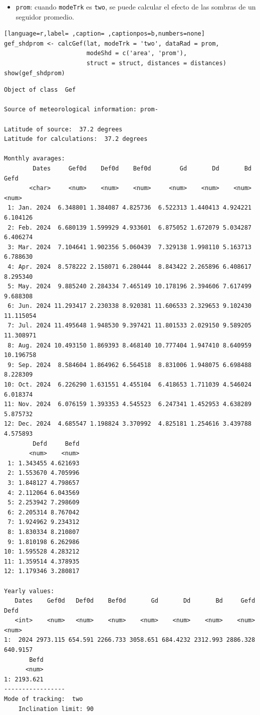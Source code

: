 \begin{itemize}
\item \texttt{prom}: cuando \texttt{modeTrk} es \texttt{two}, se puede calcular el efecto de las sombras de un seguidor promedio.
\end{itemize}
\begin{lstlisting}[language=r,label= ,caption= ,captionpos=b,numbers=none]
gef_shdprom <- calcGef(lat, modeTrk = 'two', dataRad = prom,
                       modeShd = c('area', 'prom'),
                       struct = struct, distances = distances)
show(gef_shdprom)
\end{lstlisting}

\begin{verbatim}
Object of class  Gef 

Source of meteorological information: prom- 

Latitude of source:  37.2 degrees
Latitude for calculations:  37.2 degrees

Monthly avarages:
        Dates     Gef0d    Def0d    Bef0d        Gd       Dd       Bd      Gefd
       <char>     <num>    <num>    <num>     <num>    <num>    <num>     <num>
 1: Jan. 2024  6.348801 1.384087 4.825736  6.522313 1.440413 4.924221  6.104126
 2: Feb. 2024  6.680139 1.599929 4.933601  6.875052 1.672079 5.034287  6.406274
 3: Mar. 2024  7.104641 1.902356 5.060439  7.329138 1.998110 5.163713  6.788630
 4: Apr. 2024  8.578222 2.158071 6.280444  8.843422 2.265896 6.408617  8.295340
 5: May. 2024  9.885240 2.284334 7.465149 10.178196 2.394606 7.617499  9.688308
 6: Jun. 2024 11.293417 2.230338 8.920381 11.606533 2.329653 9.102430 11.115054
 7: Jul. 2024 11.495648 1.948530 9.397421 11.801533 2.029150 9.589205 11.308971
 8: Aug. 2024 10.493150 1.869393 8.468140 10.777404 1.947410 8.640959 10.196758
 9: Sep. 2024  8.584604 1.864962 6.564518  8.831006 1.948075 6.698488  8.228309
10: Oct. 2024  6.226290 1.631551 4.455104  6.418653 1.711039 4.546024  6.018374
11: Nov. 2024  6.076159 1.393353 4.545523  6.247341 1.452953 4.638289  5.875732
12: Dec. 2024  4.685547 1.198824 3.370992  4.825181 1.254616 3.439788  4.575893
        Defd     Befd
       <num>    <num>
 1: 1.343455 4.621693
 2: 1.553670 4.705996
 3: 1.848127 4.798657
 4: 2.112064 6.043569
 5: 2.253942 7.298609
 6: 2.205314 8.767042
 7: 1.924962 9.234312
 8: 1.830334 8.210807
 9: 1.810198 6.262986
10: 1.595528 4.283212
11: 1.359514 4.378935
12: 1.179346 3.280817

Yearly values:
   Dates    Gef0d   Def0d    Bef0d       Gd       Dd       Bd     Gefd     Defd
   <int>    <num>   <num>    <num>    <num>    <num>    <num>    <num>    <num>
1:  2024 2973.115 654.591 2266.733 3058.651 684.4232 2312.993 2886.328 640.9157
       Befd
      <num>
1: 2193.621
-----------------
Mode of tracking:  two 
    Inclination limit: 90
\end{verbatim}

